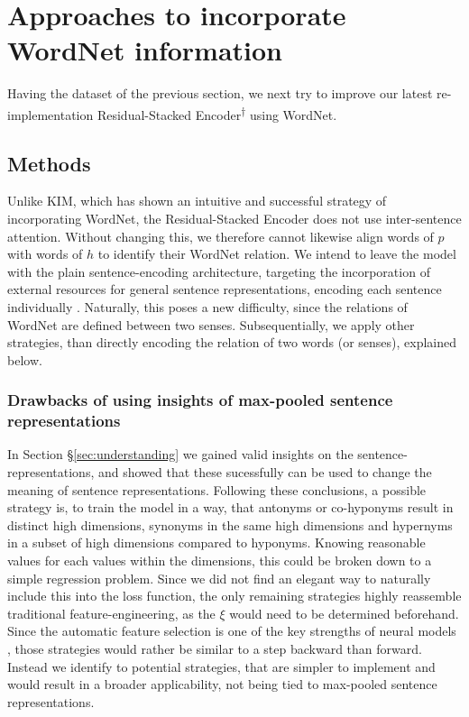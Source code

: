 \section{Approaches to incorporate WordNet information}\label{sec:approaches_ext_res}
Having the dataset of the previous section, we next try to improve our latest re-implementation Residual-Stacked Encoder\textsuperscript{$\dagger$} using WordNet. 
\subsection{Methods}
Unlike \ac{KIM}, which has shown an intuitive and successful strategy of incorporating WordNet, the Residual-Stacked Encoder does not use inter-sentence attention. Without changing this, we therefore cannot likewise align words of $p$ with words of $h$ to identify their WordNet relation. We intend to leave the model with the plain sentence-encoding architecture, targeting the incorporation of external resources for general sentence representations, encoding each sentence individually \citep{nangia2017repeval}. Naturally, this poses a new difficulty, since the relations of WordNet are defined between two senses. Subsequentially, we apply other strategies, than directly encoding the relation of two words (or senses), explained below.
\subsubsection{Drawbacks of using insights of max-pooled sentence representations}
In Section §\ref{sec:understanding} we gained valid insights on the sentence-representations, and showed that these sucessfully can be used to change the meaning of sentence representations. Following these conclusions, a possible strategy is, to train the model in a way, that antonyms or co-hyponyms result in distinct high dimensions, synonyms in the same high dimensions and hypernyms in a subset of high dimensions compared to hyponyms. Knowing reasonable values for each values within the dimensions, this could be broken down to a simple regression problem. Since we did not find an elegant way to naturally include this into the loss function, the only remaining strategies highly reassemble traditional feature-engineering, as the $\xi$ would need to be determined beforehand. Since the automatic feature selection is one of the key strengths of neural models \citep{bengio2013representation}, those strategies would rather be similar to a step backward than forward. Instead we identify to potential strategies, that are simpler to implement and would result in a broader applicability, not being tied to max-pooled sentence representations.

